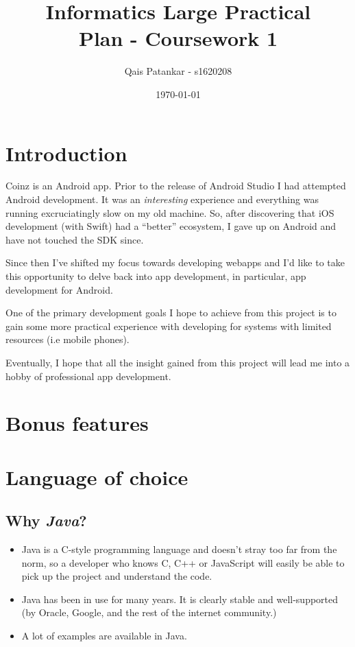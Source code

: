 \documentclass[a4paper]{article}
\title{Informatics Large Practical \\ \large{Plan - Coursework 1}}
\author{Qais Patankar - s1620208}
\date{\today}
\begin{document}
\maketitle

\section{Introduction}
\label{sec:introduction}

Coinz is an Android app. Prior to the release of Android Studio I had attempted Android development. It was an \textit{interesting} experience and everything was running excruciatingly slow on my old machine. So, after discovering that iOS development (with Swift) had a ``better'' ecosystem, I gave up on Android and have not touched the SDK since.

Since then I've shifted my focus towards developing webapps and I'd like to take this opportunity to delve back into app development, in particular, app development for Android.

One of the primary development goals I hope to achieve from this project is to gain some more practical experience with developing for systems with limited resources (i.e mobile phones).

Eventually, I hope that all the insight gained from this project will lead me into a hobby of professional app development.

\section{Bonus features}
\label{sec:bonus}
\pagebreak

\section{Language of choice}
\label{sec:language}


\subsection{Why \emph{Java}?}
\begin{itemize}
    \item Java is a C-style programming language and doesn't stray too far from the norm, so a developer who knows C, C++ or JavaScript will easily be able to pick up the project and understand the code.
    \item Java has been in use for many years. It is clearly stable and well-supported (by Oracle, Google, and the rest of the internet community.)
    \item A lot of examples are available in Java.
\end{itemize}
\end{document}
